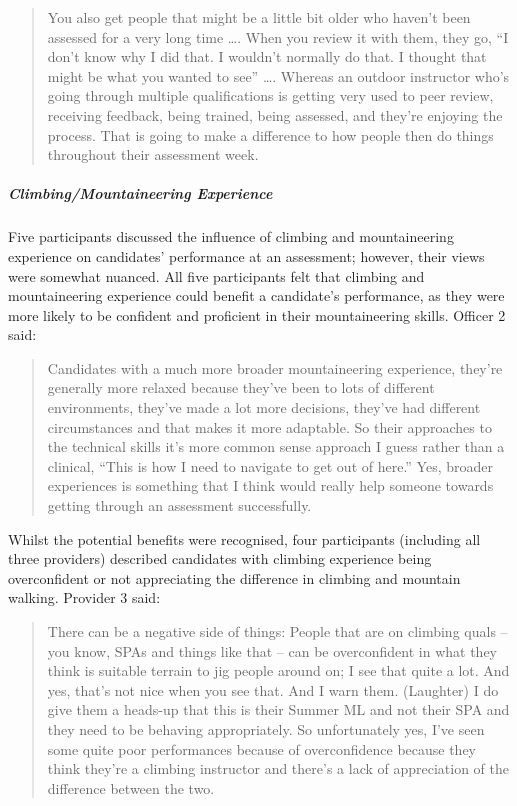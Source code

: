 \documentclass[
  12pt,
  a4paper,
]{book}
\begin{document}
\begin{quote}
You also get people that might be a little bit older who haven't been assessed for a very long time \ldots. When you review it with them, they go, ``I don't know why I did that. I wouldn't normally do that. I thought that might be what you wanted to see'' \ldots. Whereas an outdoor instructor who's going through multiple qualifications is getting very used to peer review, receiving feedback, being trained, being assessed, and they're enjoying the process. That is going to make a difference to how people then do things throughout their assessment week.
\end{quote}

\hypertarget{climbingmountaineering-experience}{%
\subparagraph{Climbing/Mountaineering Experience}\label{climbingmountaineering-experience}}

Five participants discussed the influence of climbing and mountaineering experience on candidates' performance at an assessment; however, their views were somewhat nuanced. All five participants felt that climbing and mountaineering experience could benefit a candidate's performance, as they were more likely to be confident and proficient in their mountaineering skills. Officer 2 said:

\begin{quote}
Candidates with a much more broader mountaineering experience, they're generally more relaxed because they've been to lots of different environments, they've made a lot more decisions, they've had different circumstances and that makes it more adaptable. So their approaches to the technical skills it's more common sense approach I guess rather than a clinical, ``This is how I need to navigate to get out of here.'' Yes, broader experiences is something that I think would really help someone towards getting through an assessment successfully.
\end{quote}

Whilst the potential benefits were recognised, four participants (including all three providers) described candidates with climbing experience being overconfident or not appreciating the difference in climbing and mountain walking. Provider 3 said:

\begin{quote}
There can be a negative side of things: People that are on climbing quals -- you know, SPAs and things like that -- can be overconfident in what they think is suitable terrain to jig people around on; I see that quite a lot. And yes, that's not nice when you see that. And I warn them. (Laughter) I do give them a heads-up that this is their Summer ML and not their SPA and they need to be behaving appropriately. So unfortunately yes, I've seen some quite poor performances because of overconfidence because they think they're a climbing instructor and there's a lack of appreciation of the difference between the two.
\end{quote}
\end{document}
